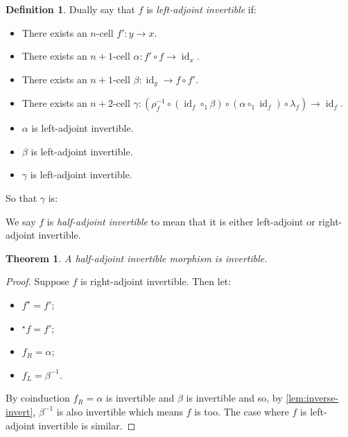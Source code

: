 \documentclass{article}
\newtheorem{theorem}{Theorem}
\theoremstyle{definition}
\newtheorem{definition}{Definition}
\theoremstyle{remark}
\DeclareMathOperator{\id}{id}
\newcommand{\linv}[1]{{}^\star\!#1}
\newcommand{\rinv}[1]{#1^\star}
\newcommand{\inv}[1]{#1^{-1}}
\begin{document}
\begin{definition}
  Dually say that \(f\) is \emph{left-adjoint invertible} if:
  \begin{itemize}
  \item There exists an \(n\)-cell \(f' : y \to x\).
  \item There exists an \(n+1\)-cell \(\alpha: f' \circ f \to \id_x\).
  \item There exists an \(n+1\)-cell \(\beta: \id_y \to f \circ f'\).
  \item There exists an \(n+2\)-cell \(\gamma: (\rho_{f}^{-1} \circ (\id_{f} \circ_1 \beta) \circ (\alpha \circ_1 \id_f) \circ \lambda_f) \to \id_f\).
  \item \(\alpha\) is left-adjoint invertible.
  \item \(\beta\) is left-adjoint invertible.
  \item \(\gamma\) is left-adjoint invertible.
  \end{itemize}

  So that \(\gamma\) is:
  \begin{center}
  \end{center}

  We say \(f\) is \emph{half-adjoint invertible} to mean that it is either left-adjoint or right-adjoint invertible.
\end{definition}

\begin{theorem}
  A half-adjoint invertible morphism is invertible.
\end{theorem}
\begin{proof}
  Suppose \(f\) is right-adjoint invertible. Then let:
  \begin{itemize}
  \item \(\rinv f = {f'}\);
  \item \(\linv f = {f'}\);
  \item \(f_R = \alpha\);
  \item \(f_L = \beta^{-1}\).
  \end{itemize}
  By coinduction \(f_R = \alpha\) is invertible and \(\beta\) is invertible and so, by \cref{lem:inverse-invert}, \(\inv \beta\) is also invertible which means \(f\) is too.
  The case where \(f\) is left-adjoint invertible is similar.
\end{proof}
\end{document}

